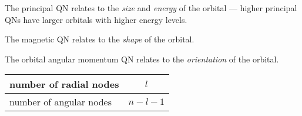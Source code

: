 The principal QN relates to the \textit{size} and \textit{energy} of the orbital --- higher principal QNs
have larger orbitals with higher energy levels.

The magnetic QN relates to the \textit{shape} of the orbital.

The orbital angular momentum QN relates to the \textit{orientation} of the orbital.

\begin{tabularx}{\linewidth}{|Y|c|} \hline
    number of radial nodes & $l$ \\ \hline
    number of angular nodes & $n - l - 1$ \\ \hline
\end{tabularx}